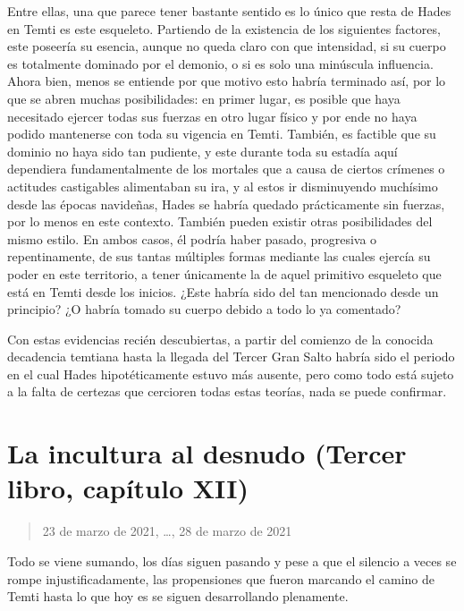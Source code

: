 \documentclass[
]{book}
\begin{document}
Entre ellas, una que parece tener bastante sentido es lo único que resta de Hades en Temti es este esqueleto. Partiendo de la existencia de los siguientes factores, este poseería su esencia, aunque no queda claro con que intensidad, si su cuerpo es totalmente dominado por el demonio, o si es solo una minúscula influencia. Ahora bien, menos se entiende por que motivo esto habría terminado así, por lo que se abren muchas posibilidades: en primer lugar, es posible que haya necesitado ejercer todas sus fuerzas en otro lugar físico y por ende no haya podido mantenerse con toda su vigencia en Temti. También, es factible que su dominio no haya sido tan pudiente, y este durante toda su estadía aquí dependiera fundamentalmente de los mortales que a causa de ciertos crímenes o actitudes castigables alimentaban su ira, y al estos ir disminuyendo muchísimo desde las épocas navideñas, Hades se habría quedado prácticamente sin fuerzas, por lo menos en este contexto. También pueden existir otras posibilidades del mismo estilo. En ambos casos, él podría haber pasado, progresiva o repentinamente, de sus tantas múltiples formas mediante las cuales ejercía su poder en este territorio, a tener únicamente la de aquel primitivo esqueleto que está en Temti desde los inicios. ¿Este habría sido del tan mencionado desde un principio? ¿O habría tomado su cuerpo debido a todo lo ya comentado?

Con estas evidencias recién descubiertas, a partir del comienzo de la conocida decadencia temtiana hasta la llegada del Tercer Gran Salto habría sido el periodo en el cual Hades hipotéticamente estuvo más ausente, pero como todo está sujeto a la falta de certezas que cercioren todas estas teorías, nada se puede confirmar.

\hypertarget{la-incultura-al-desnudo-tercer-libro-capuxedtulo-xii}{%
\section{La incultura al desnudo (Tercer libro, capítulo XII)}\label{la-incultura-al-desnudo-tercer-libro-capuxedtulo-xii}}

\begin{quote}
23 de marzo de 2021, \ldots, 28 de marzo de 2021
\end{quote}

Todo se viene sumando, los días siguen pasando y pese a que el silencio a veces se rompe injustificadamente, las propensiones que fueron marcando el camino de Temti hasta lo que hoy es se siguen desarrollando plenamente.
\end{document}

